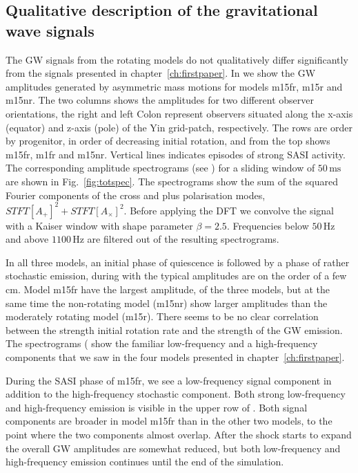 \subsection{Qualitative description of the gravitational wave signals}
The GW signals from the rotating models do not qualitatively differ significantly from
the signals presented in chapter~\ref{ch:firstpaper}. In  we show the
GW amplitudes generated by asymmetric mass motions for models m15fr, m15r and m15nr.
The two columns shows the amplitudes for two different observer orientations,
the right and left Colon represent observers situated along the x-axis (equator) and z-axis (pole) of the Yin grid-patch,
respectively. The rows are order by progenitor, in order of decreasing initial rotation, and from the top
shows m15fr, m1fr and m15nr. Vertical lines indicates episodes of strong SASI activity.
The corresponding amplitude spectrograms (see ) for a sliding window of $50 \, \mathrm{ms}$ are shown 
in Fig.~\ref{fig:totspec}. The spectrograms show the sum of the squared Fourier
components of the cross and plus polarisation modes,
$STFT[{A_+}]^2 + STFT[{A_{\times}}]^2$. Before applying the
DFT we convolve the signal with a Kaiser window with shape parameter $\beta = 2.5$. Frequencies
below $50 \, \mathrm{Hz}$ and above $1100  \, \mathrm{Hz}$ are filtered out of the resulting spectrograms. 

In all three models, an initial phase of quiescence is followed by a phase of rather stochastic emission, 
during with the typical amplitudes are on the order of a few cm. Model m15fr have the largest amplitude, of the three
models, but at the same time the non-rotating model (m15nr) show larger amplitudes than the moderately rotating model (m15r).
There seems to be no clear correlation between the strength initial rotation rate and the strength of the GW emission. 
The spectrograms ( show the familiar low-frequency and a high-frequency components that we saw in the
four models presented in chapter~\ref{ch:firstpaper}.

During the SASI phase of m15fr, we see a low-frequency signal component in addition 
to the high-frequency stochastic component. Both strong low-frequency and high-frequency
emission is visible in the upper row of . Both signal components
are broader in model m15fr than in the other two models, to the point where the two components almost
overlap. After the shock starts to expand the overall GW amplitudes are somewhat reduced, but
both low-frequency and high-frequency emission continues until the end of the simulation.

